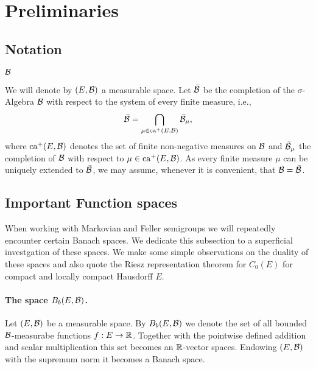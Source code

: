 \documentclass[../Master.tex]{subfiles}
\begin{document}
\section{Preliminaries}

\subsection{Notation}

\(\mathcal{B} \)

We will denote by \((E,\mathcal{B})\) a measurable space. Let \(\bar{\mathcal{B}}\) be the completion of the \(\sigma \)-Algebra \(\mathcal{B} \) with respect to the system of every finite measure, i.e.,
\begin{equation*}\bar{\mathcal{B}} = \bigcap_{\mu \in \mathrm{ca}^+(E,\mathcal{B})} \bar{\mathcal{B}}_\mu,
\end{equation*}
where \(\mathrm{ca}^+(E,\mathcal{B})\) denotes the set of finite non-negative measures on \(\mathcal{B} \) and \(\bar{\mathcal{B}}_\mu \) the completion of \(\mathcal{B} \) with respect to \(\mu \in \mathrm{ca}^+(E,\mathcal{B}) \). As every finite measure \(\mu \) can be uniquely extended to \(\bar{\mathcal{B}} \), we may assume, whenever it is convenient, that \(\mathcal{B} = \bar{\mathcal{B}} \).



\subsection{Important Function spaces}

When working with Markovian and Feller semigroups we will repeatedly encounter certain Banach spaces. We dedicate this subsection to a superficial investgation of these spaces. We make some simple observations on the duality of these spaces and also quote the Riesz representation theorem for \(C_0(E)\) for compact and locally compact Hausdorff \(E\).

\paragraph{The space \(B_b(E,\mathcal{B})\).}
Let \((E,\mathcal{B})\) be a measurable space. By \(B_b (E,\mathcal{B})\) we denote the set of all bounded \(\mathcal{B} \)-measurabe functions \(f : E \to \mathbb{R} \). Together with the pointwise defined addition and scalar multiplication this set becomes an \(\mathbb{R} \)-vector spaces. Endowing \((E,\mathcal{B})\) with the supremum norm it becomes a Banach space. 
\end{document}
